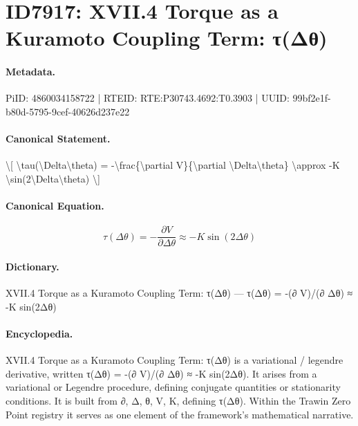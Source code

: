 \section*{ID7917: XVII.4 Torque as a Kuramoto Coupling Term: τ(Δθ)}
\paragraph{Metadata.}
PiID: 4860034158722 | RTEID: RTE:P30743.4692:T0.3903 | UUID: 99bf2e1f-b80d-5795-9cef-40626d237e22

\paragraph{Canonical Statement.}
\textbackslash{}[ \textbackslash{}tau(\textbackslash{}Delta\textbackslash{}theta) = -\textbackslash{}frac\{\textbackslash{}partial V\}\{\textbackslash{}partial \textbackslash{}Delta\textbackslash{}theta\} \textbackslash{}approx -K \textbackslash{}sin(2\textbackslash{}Delta\textbackslash{}theta) \textbackslash{}]

\paragraph{Canonical Equation.}
\[
\tau(\Delta\theta) = -\frac{\partial V}{\partial \Delta\theta} \approx -K \sin(2\Delta\theta)
\]

\paragraph{Dictionary.}
XVII.4 Torque as a Kuramoto Coupling Term: τ(Δθ) — τ(Δθ) = -(∂ V)/(∂ Δθ) ≈ -K sin(2Δθ)

\paragraph{Encyclopedia.}
XVII.4 Torque as a Kuramoto Coupling Term: τ(Δθ) is a variational / legendre derivative, written τ(Δθ) = -(∂ V)/(∂ Δθ) ≈ -K sin(2Δθ). It arises from a variational or Legendre procedure, defining conjugate quantities or stationarity conditions. It is built from ∂, Δ, θ, V, K, defining τ(Δθ). Within the Trawin Zero Point registry it serves as one element of the framework's mathematical narrative.
